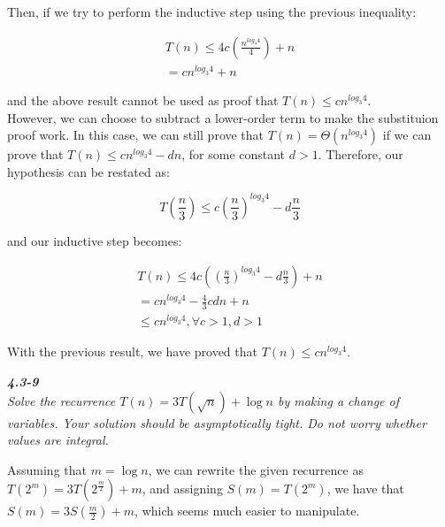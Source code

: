 \documentclass[8pt,a4paper]{article}
\begin{document}
  Then, if we try to perform the inductive step using the previous inequality:

\begin{equation*}
  \begin{split}
    T(n) \leq 4c\left(\frac{n^{log_{3} 4}}{4}\right) + n \\
    = cn^{log_{3} 4} + n
  \end{split}
\end{equation*}

and the above result cannot be used as proof that $T(n) \leq cn^{log_{3} 4}$. \\

  However, we can choose to subtract a lower-order term to make the substituion proof
work. In this case, we can still prove that $T(n) = \Theta(n^{log_{3} 4})$ if we can prove
that $T(n) \leq cn^{log_{3} 4} - dn$, for some constant $d > 1$. Therefore, our hypothesis
can be restated as:

\begin{equation*}
  T\left(\frac{n}{3}\right) \leq c\left(\frac{n}{3}\right)^{log_{3} 4} - d\frac{n}{3}
\end{equation*}

and our inductive step becomes:

\begin{equation*}
  \begin{split}
    T(n) \leq 4c\left(\left(\frac{n}{3}\right)^{log_{3} 4} - d\frac{n}{3}\right) + n \\
    = cn^{log_{3} 4} - \frac{4}{3} cdn + n \\
    \leq cn^{log_{3} 4}, \forall c > 1, d > 1
  \end{split}
\end{equation*}

  With the previous result, we have proved that $T(n) \leq cn^{log_{3} 4}$.

\begin{framed}
\textbf{\textit{4.3-9}} \\
\textit{Solve the recurrence $T(n) = 3T(\sqrt{n}) + \log n$ by making a change of variables.
Your solution should be asymptotically tight. Do not worry whether values are integral.}
\end{framed}

  Assuming that $m = \log n$, we can rewrite the given recurrence as $T(2^{m}) = 3T(2^{\frac{m}{2}}) + m$,
and assigning $S(m) = T(2^{m})$, we have that $S(m) = 3S(\frac{m}{2}) + m$, which seems much easier
to manipulate. \\
\end{document}
